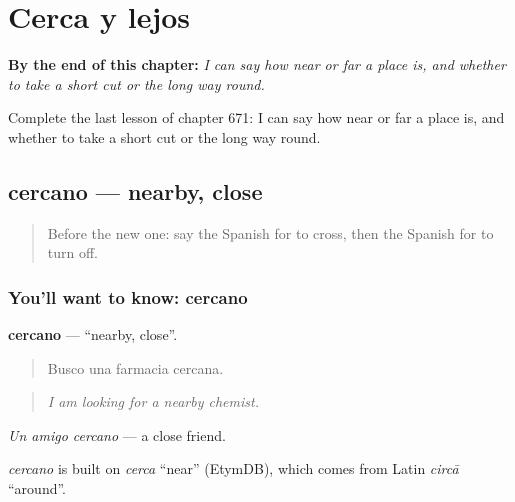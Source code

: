 
\chapter{Cerca y lejos}
\label{ch:es-cerca-y-lejos}

\begin{chapteropening}
\textbf{By the end of this chapter:} \emph{I can say how near or far a place is, and whether to take a short cut or the long way round.}

Complete the last lesson of chapter 671: I can say how near or far a place is, and whether to take a short cut or the long way round.
\end{chapteropening}

\section[cercano]{cercano — nearby, close}

\label{lesson:ES-C671-cercano}



\begin{quote}
Before the new one: say the Spanish for to cross, then the Spanish for to turn off.
\end{quote}

\subsection*{You'll want to know: cercano}
\textbf{cercano} — \textquotedblleft{}nearby, close\textquotedblright{}.

\begin{quote}
Busco una farmacia cercana.
\end{quote}

\begin{quote}
\emph{I am looking for a nearby chemist.}
\end{quote}

\emph{Un amigo cercano} — a close friend.

\begin{cousinweb}
\emph{cercano} is built on \emph{cerca} \textquotedblleft{}near\textquotedblright{} (EtymDB), which comes from Latin \emph{circā} \textquotedblleft{}around\textquotedblright{}.
\end{cousinweb}

